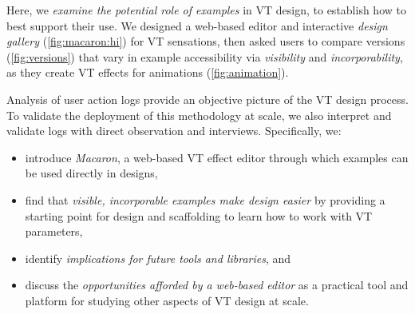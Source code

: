 

Here, we \textit{examine the potential role of examples} in VT design, to establish how to best support their use.
We designed a web-based editor and interactive \emph{design gallery} \cite{Lee2010a,Marks1997} (\autoref{fig:macaron:hi}) for VT sensations,
then asked users to compare versions (\autoref{fig:versions}) that vary in example accessibility via \emph{visibility} and \emph{incorporability}, as they create VT effects for animations (\autoref{fig:animation}).

Analysis of user action logs provide an objective picture of the VT design process. To validate the deployment of this methodology at scale, we also interpret and validate logs with direct observation and interviews.
Specifically, we:
\begin{itemize}
\item introduce \textit{Macaron}, a web-based VT effect editor through which examples can be used directly in designs,
\item find that \textit{visible, incorporable examples make design easier} by providing a starting point for design and scaffolding to learn how to work with VT parameters,
\item identify \textit{implications for future tools and libraries}, and
\item discuss the \textit{opportunities afforded by a web-based editor} as a practical tool and platform for studying other aspects of VT design at scale.
\end{itemize}











